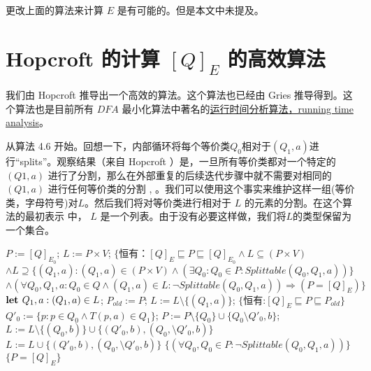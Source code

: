更改上面的算法来计算 $E$ 是有可能的。但是本文中未提及。

\section{Hopcroft 的计算 $[Q]_E$ 的高效算法}

我们由 Hopcroft 推导出一个高效的算法。这个算法也已经由 Gries \cite{Grie73} 推导得到。这个算法也是目前所有 $DFA$ 最小化算法中著名的\uline{运行时间分析算法，running time analysis}。

从算法 4.6 开始。回想一下，内部循环将每个等价类$Q_0$相对于$(Q_1, a)$进行“splits”。观察结果（来自 Hopcroft ）是，一旦所有等价类都对一个特定的 $(Q1,a)$ 进行了分割，那么在外部重复的后续迭代步骤中就不需要对相同的$(Q1,a)$ 进行任何等价类的分割 \cite[pp.190-191]{Hopc71}, \cite[引理 5]{Grie73}。我们可以使用这个事实来维护这样一组(等价类，字母符号)对$L$。然后我们将对等价类进行相对于 $L$ 的元素的分割。在这个算法的最初表示 \cite{Hopc71, Grie73} 中， $L$ 是一个列表。由于没有必要这样做，我们将$L$的类型保留为一个集合。

\begin{algorithm}
    \small
    \begin{algorithmic}[1]
        \State $P:=[Q]_{E_0}$;
        \State $L:=P\times V$;
        \State $\{ \mbox{恒有：} [Q]_E \sqsubseteq P \sqsubseteq [Q]_{E_0} \land L \subseteq (P \times V) $
        \State \quad $ \land L \supseteq  \{ (Q_1,a) : (Q_1,a) \in (P \times V) \land ( \exists Q_0 : Q_0 \in P : Splittable (Q_0,Q_1,a) ) \} $
        \State \quad $ \land (\forall Q_0,Q_1,a:Q_0 \in Q \land (Q_1,a) \in L : \neg Splittable (Q_0,Q_1,a)) \Rightarrow (P=[Q]_E) \} $
            \State $ \mbox{\textbf{let }} Q_1,a:(Q_1,a) \in L $;
            \State $ P_{old} := P $;
            \State $ L := L \setminus \{ (Q_1,a) \} $;
            \State $ \{ \mbox{恒有:} [Q]_E \sqsubseteq P \sqsubseteq P_{old} \} $
                \State $ Q'_0 := \{ p:p \in Q_0 \land T(p,a) \in Q_1 \} $;
                \State $ P:= P \setminus \{ Q_0 \} \cup \{ Q_0 \setminus Q'_0,b \} $;
                       $ L := L \setminus \{ (Q_0,b) \} \cup \{ (Q'_0,b),(Q_0, \setminus Q'_0,b ) \} $
                        $L := L \cup \{ (Q'_0,b),(Q_0, \setminus Q'_0,b ) \}$
                    \EndIf
                \EndFor
            \EndFor
            \State $ \{ (\forall Q_0,Q_0 \in P : \neg Splittable(Q_0,Q_1,a)) \} $
        \Until $\{ P = [Q]_E \}$
    \end{algorithmic}
\end{algorithm}

